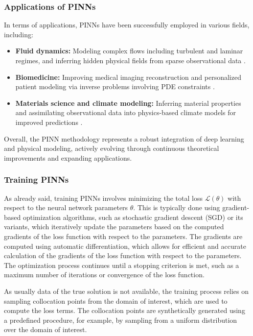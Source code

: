 \documentclass[12pt]{report} %
\theoremstyle{plain}           %
\theoremstyle{definition}      %
\theoremstyle{remark}          %
\begin{document}
\subsubsection{Applications of PINNs}
In terms of applications, PINNs have been successfully employed in various fields, including:
\begin{itemize}
    \item \textbf{Fluid dynamics:} Modeling complex flows including turbulent 
	and laminar regimes, and inferring hidden physical fields from sparse observational 
	data \cite{RAISSI2019686, Bhatnagar_2019}.
    
    \item \textbf{Biomedicine:} Improving medical imaging reconstruction and personalized patient 
	modeling via inverse problems involving PDE constraints \cite{banerjee2024pinnsmedicalimageanalysis}.
    
    \item \textbf{Materials science and climate modeling:} Inferring material properties and 
	assimilating observational data into physics-based climate models for improved 
	predictions \cite{karniadakis2021physics}.
\end{itemize}
Overall, the PINN methodology represents a robust integration of deep learning and physical 
modeling, actively evolving through continuous theoretical improvements and expanding applications.

\subsubsection{Training PINNs}
As already said, training PINNs involves minimizing the total loss $\mathcal{L}(\theta)$ with respect to the
neural network parameters $\theta$. This is typically done using gradient-based optimization algorithms,
such as stochastic gradient descent (SGD) or its variants, which iteratively update the parameters
based on the computed gradients of the loss function with respect to the parameters. The gradients are
computed using automatic differentiation, which allows for efficient and accurate calculation of the gradients
of the loss function with respect to the parameters. The optimization process continues until a stopping criterion is met,
such as a maximum number of iterations or convergence of the loss function.

As usually data of the true solution is not available, the training process relies on sampling collocation points
from the domain of interest, which are used to compute the loss terms. The collocation points are synthetically generated
using a predefined procedure, for example, by sampling from a uniform distribution over the domain of interest.
\end{document}
